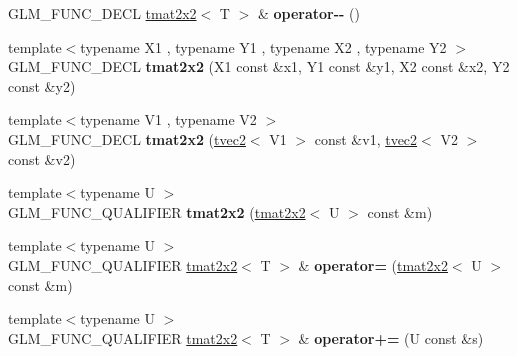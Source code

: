 \begin{DoxyCompactItemize}
\item 
\hypertarget{structglm_1_1detail_1_1tmat2x2_a31bbbcc16ab65eef93820ebce0cfed5f}{}G\+L\+M\+\_\+\+F\+U\+N\+C\+\_\+\+D\+E\+C\+L \hyperlink{structglm_1_1detail_1_1tmat2x2}{tmat2x2}$<$ T $>$ \& {\bfseries operator-\/-\/} ()\label{structglm_1_1detail_1_1tmat2x2_a31bbbcc16ab65eef93820ebce0cfed5f}

\item 
\hypertarget{structglm_1_1detail_1_1tmat2x2_a156ed12a043a58be23c0ca52a96f3ad6}{}{\footnotesize template$<$typename X1 , typename Y1 , typename X2 , typename Y2 $>$ }\\G\+L\+M\+\_\+\+F\+U\+N\+C\+\_\+\+D\+E\+C\+L {\bfseries tmat2x2} (X1 const \&x1, Y1 const \&y1, X2 const \&x2, Y2 const \&y2)\label{structglm_1_1detail_1_1tmat2x2_a156ed12a043a58be23c0ca52a96f3ad6}

\item 
\hypertarget{structglm_1_1detail_1_1tmat2x2_a5917090f191c8bd7ecbe81e369819e8a}{}{\footnotesize template$<$typename V1 , typename V2 $>$ }\\G\+L\+M\+\_\+\+F\+U\+N\+C\+\_\+\+D\+E\+C\+L {\bfseries tmat2x2} (\hyperlink{structglm_1_1detail_1_1tvec2}{tvec2}$<$ V1 $>$ const \&v1, \hyperlink{structglm_1_1detail_1_1tvec2}{tvec2}$<$ V2 $>$ const \&v2)\label{structglm_1_1detail_1_1tmat2x2_a5917090f191c8bd7ecbe81e369819e8a}

\item 
\hypertarget{structglm_1_1detail_1_1tmat2x2_a585d4b0bc985e4fa2f078000743972bb}{}{\footnotesize template$<$typename U $>$ }\\G\+L\+M\+\_\+\+F\+U\+N\+C\+\_\+\+Q\+U\+A\+L\+I\+F\+I\+E\+R {\bfseries tmat2x2} (\hyperlink{structglm_1_1detail_1_1tmat2x2}{tmat2x2}$<$ U $>$ const \&m)\label{structglm_1_1detail_1_1tmat2x2_a585d4b0bc985e4fa2f078000743972bb}

\item 
\hypertarget{structglm_1_1detail_1_1tmat2x2_a520a2abf2e623dcbfc6af9c1b4d41206}{}{\footnotesize template$<$typename U $>$ }\\G\+L\+M\+\_\+\+F\+U\+N\+C\+\_\+\+Q\+U\+A\+L\+I\+F\+I\+E\+R \hyperlink{structglm_1_1detail_1_1tmat2x2}{tmat2x2}$<$ T $>$ \& {\bfseries operator=} (\hyperlink{structglm_1_1detail_1_1tmat2x2}{tmat2x2}$<$ U $>$ const \&m)\label{structglm_1_1detail_1_1tmat2x2_a520a2abf2e623dcbfc6af9c1b4d41206}

\item 
\hypertarget{structglm_1_1detail_1_1tmat2x2_af03e41d83e503acff6fd07644c2aea26}{}{\footnotesize template$<$typename U $>$ }\\G\+L\+M\+\_\+\+F\+U\+N\+C\+\_\+\+Q\+U\+A\+L\+I\+F\+I\+E\+R \hyperlink{structglm_1_1detail_1_1tmat2x2}{tmat2x2}$<$ T $>$ \& {\bfseries operator+=} (U const \&s)\label{structglm_1_1detail_1_1tmat2x2_af03e41d83e503acff6fd07644c2aea26}


\end{DoxyCompactItemize}
